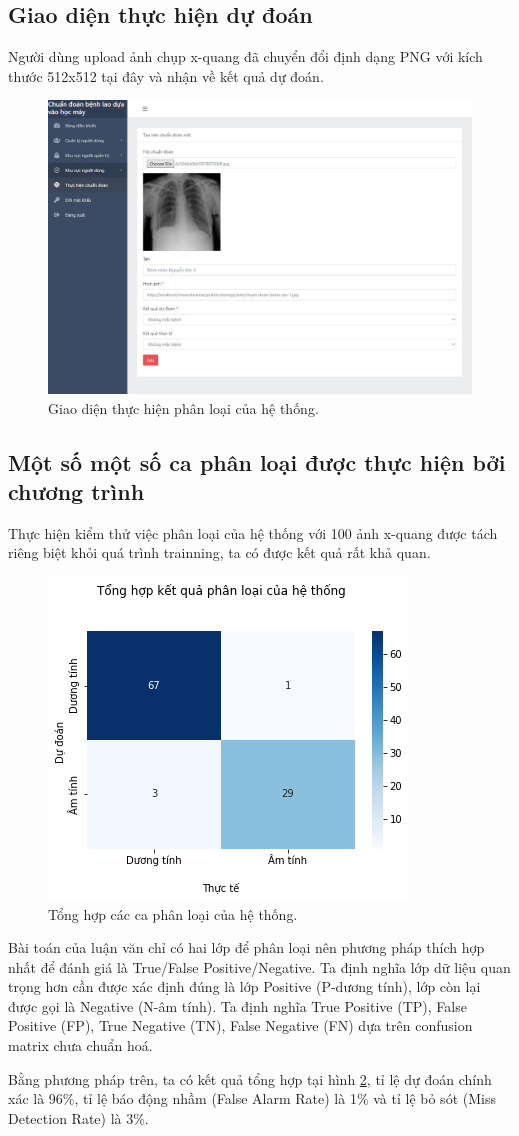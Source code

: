 \subsection{Giao diện thực hiện dự đoán}
Người dùng upload ảnh chụp x-quang đã chuyển đổi định dạng PNG với kích thước 512x512 tại đây và nhận về kết quả dự đoán.
\begin{figure}[H]
	\centering
	\includegraphics[width=0.95\linewidth]{images/user_du_doan_chi_tiet}
	\caption{Giao diện thực hiện phân loại của hệ thống.}
	\label{fig:user_danh_sach}
\end{figure}

\subsection{Một số một số ca phân loại được thực hiện bởi chương trình}
Thực hiện kiểm thử việc phân loại của hệ thống với 100 ảnh x-quang được tách riêng biệt khỏi quá trình trainning, ta có được kết quả rất khả quan.
\begin{figure}[H]
	\centering
	\includegraphics[width=0.66\linewidth]{images/result_backtest}
	\caption{Tổng hợp các ca phân loại của hệ thống.}
	\label{fig:result_backtest}
\end{figure}
Bài toán của luận văn chỉ có hai lớp để phân loại nên phương pháp thích hợp nhất để đánh giá là True/False Positive/Negative. Ta định nghĩa lớp dữ liệu quan trọng hơn cần được xác định đúng là lớp Positive (P-dương tính), lớp còn lại được gọi là Negative (N-âm tính). Ta định nghĩa True Positive (TP), False Positive (FP), True Negative (TN), False Negative (FN) dựa trên confusion matrix chưa chuẩn hoá. 

Bằng phương pháp trên, ta có kết quả tổng hợp tại hình \ref{fig:result_backtest}, tỉ lệ dự đoán chính xác là 96\%, tỉ lệ báo động nhầm (False Alarm Rate) là 1\% và tỉ lệ bỏ sót (Miss Detection Rate) là 3\%.  
